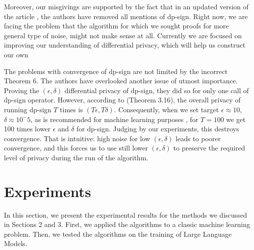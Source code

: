 \documentclass[12pt]{article}
\begin{document}
Moreover, our misgivings are supported by the fact that in an updated version \cite{Jin2024} of the article \cite{Jin2020}, the authors have removed all mentions of dp-sign. Right now, we are facing the problem that the algorithm for which we sought proofs for more general type of noise, might not make sense at all. Currently we are focused on improving our understanding of differential privacy, which will help us construct our own 

The problems with convergence of dp-sign are not limited by the incorrect Theorem 6. The authors have overlooked another issue of utmost importance. Proving the $(\epsilon, \delta)$ differential privacy of dp-sign, they did so for only one call of dp-sign operator. However, according to \cite{Dwork2014} (Theorem 3.16), the overall privacy of running dp-sign $T$ times is $(T \epsilon, T \delta)$. Consequently, when we set target $\epsilon \approx 10$, $\delta \approx 10^-5$, as is recommended for machine learning purposes \cite{Ponomareva2023}, for $T = 100$ we get 100 times lower $\epsilon$ and $\delta$ for dp-sign. Judging by our experiments, this destroys convergence. That is intuitive: high noise for low $(\epsilon, \delta)$ leads to poorer convergence, and this forces us to use still lower $(\epsilon, \delta)$ to preserve the required level of privacy during the run of the algorithm.


\section{Experiments}
In this section, we present the experimental results for the methods we discussed in Sections 2 and 3. First, we applied the algorithms to a classic machine learning problem. Then, we tested the algorithms on the training of Large Language Models.
\end{document}
